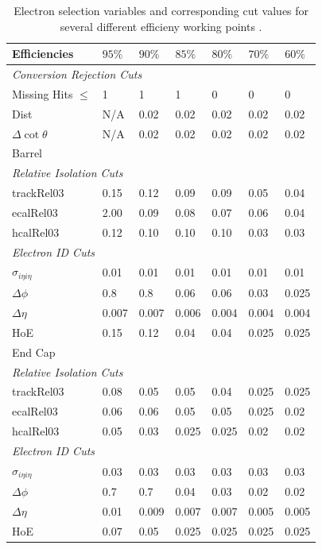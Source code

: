 \begin{table}[htbp]
  \begin{center}
    \begin{tabular}{lllllll} 
\toprule
Efficiencies& $95\%$& $90\%$& $85\%$& $80\%$& $70\%$& $60\%$\\
\midrule
\multicolumn{7}{l}{\emph{Conversion Rejection Cuts}}\\ 
Missing Hits $\leq$& 1& 1& 1& 0& 0& 0\\
Dist& N/A& 0.02& 0.02& 0.02& 0.02& 0.02\\
$\Delta\cot\theta$& N/A& 0.02& 0.02& 0.02& 0.02& 0.02\\
\midrule
\multicolumn{7}{l}{Barrel}\\ 
\multicolumn{7}{l}{\emph{Relative Isolation Cuts}} \\
trackRel03& 0.15& 0.12& 0.09& 0.09& 0.05& 0.04\\
ecalRel03& 2.00& 0.09& 0.08& 0.07& 0.06& 0.04\\
hcalRel03& 0.12& 0.10& 0.10& 0.10& 0.03& 0.03\\
\multicolumn{7}{l}{\emph{Electron ID Cuts}} \\
$\sigma_{i\eta i\eta}$& 0.01& 0.01& 0.01& 0.01& 0.01& 0.01\\
$\Delta \phi$& 0.8& 0.8& 0.06& 0.06& 0.03& 0.025\\
$\Delta \eta$& 0.007& 0.007& 0.006& 0.004& 0.004& 0.004\\
HoE& 0.15& 0.12& 0.04& 0.04& 0.025& 0.025\\
\midrule
\multicolumn{7}{l}{End Cap}\\ 
\multicolumn{7}{l}{\emph{Relative Isolation Cuts}} \\
trackRel03& 0.08& 0.05& 0.05& 0.04& 0.025& 0.025\\
ecalRel03& 0.06& 0.06& 0.05& 0.05& 0.025& 0.02\\
hcalRel03& 0.05& 0.03& 0.025& 0.025& 0.02& 0.02\\
\multicolumn{7}{l}{\emph{Electron ID Cuts}} \\
$\sigma_{i\eta i\eta}$& 0.03& 0.03& 0.03& 0.03& 0.03& 0.03\\
$\Delta \phi$& 0.7& 0.7& 0.04& 0.03& 0.02& 0.02\\
$\Delta \eta$& 0.01& 0.009& 0.007& 0.007& 0.005& 0.005\\
HoE& 0.07& 0.05& 0.025& 0.025& 0.025& 0.025\\
\bottomrule
    \end{tabular}
    \caption{Electron selection variables and
corresponding cut values for several different efficieny working points
\cite{nikos}.}
  \end{center}
\label{tab:electronwp} 
\end{table}

